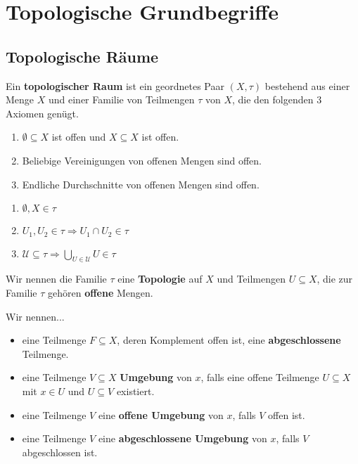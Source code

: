 \documentclass[main.tex]{subfiles}
\begin{document}
\chapter{Topologische Grundbegriffe}


\section{Topologische Räume}

\begin{Definition}[Topologie]
  Ein \textbf{topologischer Raum} ist ein geordnetes Paar $(X,\tau)$ bestehend aus einer Menge $X$ und einer Familie von Teilmengen $\tau$ von $X$, die den folgenden 3 Axiomen genügt.

  \begin{minipage}[t]{0.5\textwidth}
    \begin{enumerate}
      \item $\emptyset \subseteq X$ ist offen und $X \subseteq X$ ist offen.
      \item Beliebige Vereinigungen von offenen Mengen sind offen.
      \item Endliche Durchschnitte von offenen Mengen sind offen.
    \end{enumerate}
  \end{minipage}
  \begin{minipage}[t]{0.5\textwidth}
    \begin{enumerate}
      \item $\emptyset, X \in \tau$
      \item $U_1, U_2 \in \tau \Rightarrow U_1 \cap U_2 \in \tau$
      \item $\mathcal{U} \subseteq \tau \Rightarrow \bigcup_{U \in \mathcal{U}} U \in \tau$
    \end{enumerate}
  \end{minipage}

  Wir nennen die Familie $\tau$ eine \textbf{Topologie} auf $X$ und Teilmengen $U \subseteq X$, die zur Familie $\tau$ gehören \textbf{offene} Mengen.

  Wir nennen...
  \begin{itemize}
    \item eine Teilmenge $F \subseteq X$, deren Komplement offen ist, eine \textbf{abgeschlossene} Teilmenge.
    \item eine Teilmenge $V \subseteq X$ \textbf{Umgebung} von $x$, falls eine offene Teilmenge $U \subseteq X$ mit $x \in U$ und $U \subseteq V$ existiert.
    \item eine Teilmenge $V$ eine \textbf{offene Umgebung} von $x$, falls $V$ offen ist.
    \item eine Teilmenge $V$ eine \textbf{abgeschlossene Umgebung} von $x$, falls $V$ abgeschlossen ist.
  \end{itemize}
\end{Definition}
\end{document}
